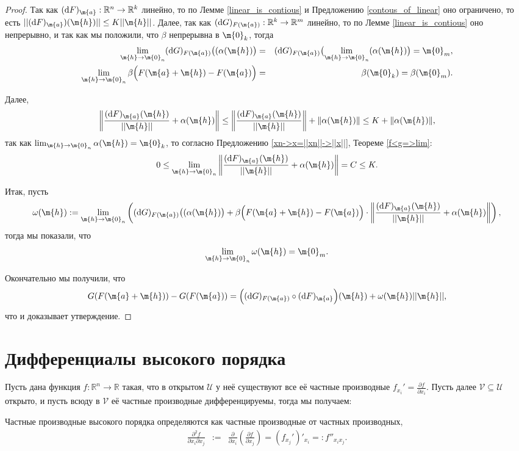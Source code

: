 \begin{proof}
Так как $(\mathrm{d}F)_\m{a}: \mathbb{R}^n \to \mathbb{R}^k$ линейно, то по Лемме \ref{linear_is_contious} и Предложению \ref{contous_of_linear} оно ограничено, то есть $|| (\mathrm{d}F)_\m{a})(\m{h}) || \le K ||\m{h}||$. Далее, так как $(\mathrm{d}G)_{F(\m{a})}: \mathbb{R}^k \to \mathbb{R}^m$ линейно, то по Лемме \ref{linear_is_contious} оно непрерывно, и так как мы положили, что $\beta$ непрерывна в $\m{0}_k$, тогда 
\begin{eqnarray*}
 \lim_{\m{h} \to \m{0}_n}(\mathrm{d}G)_{F(\m{a})}\bigl((\alpha(\m{h})\bigr) &=& (\mathrm{d}G)_{F(\m{a})}\bigl( \lim_{\m{h} \to \m{0}_n} (\alpha(\m{h})\bigr) = \m{0}_m,\\
 \lim_{\m{h} \to \m{0}_n} \beta \Bigl(F(\m{a} + \m{h}) - F(\m{a}) \Bigr) &=& \beta (\m{0}_k) = \beta(\m{0}_m). 
\end{eqnarray*}

Далее, 
\[
  \left\| \frac{(\mathrm{d}F)_\m{a}(\m{h})}{|| \m{h} ||} + \alpha(\m{h})  \right\| \le \left\| \frac{(\mathrm{d}F)_\m{a}(\m{h})}{|| \m{h} ||} \right\| + \| \alpha(\m{h}) \| \le K + \| \alpha(\m{h}) \|,
\]
так как $\lim_{\m{h} \to \m{0}_n}\alpha(\m{h}) = \m{0}_k$, то согласно Предложению \ref{xn->x=||xn||->||x||}, Теореме \ref{f<g=>lim}:
\[
 0 \le \lim_{\m{h} \to \m{0}_n}\left\| \frac{(\mathrm{d}F)_\m{a}(\m{h})}{|| \m{h} ||} + \alpha(\m{h})  \right\| =C \le K.
\]

Итак, пусть
\[
 \omega (\m{h}): = \lim_{\m{h} \to \m{0}_n}\left( (\mathrm{d}G)_{F(\m{a})}\bigl((\alpha(\m{h})\bigr) + \beta \Bigl(F(\m{a} + \m{h}) - F(\m{a}) \Bigr) \cdot \left\| \frac{(\mathrm{d}F)_\m{a}(\m{h})}{|| \m{h} ||} + \alpha(\m{h})  \right\| \right),
\]
тогда мы показали, что
\[
 \lim_{\m{h} \to \m{0}_n} \omega (\m{h}) = \m{0}_m. 
\]

Окончательно мы получили, что
\[
 G(F(\m{a}+\m{h})) -G(F(\m{a})) =\Bigl((\mathrm{d}G)_{F(\m{a})} \circ (\mathrm{d}F)_\m{a}\Bigr) (\m{h}) +   \omega (\m{h}) || \m{h} ||,
\]
что и доказывает утверждение.
\end{proof}


\section{Дифференциалы высокого порядка}

Пусть дана функция $f: \mathbb{R}^n \to \mathbb{R}$ такая, что в открытом $\mathscr{U}$ у неё существуют все её частные производные $f_{x_i}' = \frac{\partial f}{\partial x_i}$. Пусть далее $\mathscr{V} \subseteq \mathscr{U}$ открыто, и пусть всюду в $\mathscr{V}$ её частные производные дифференцируемы, тогда мы получаем:
\begin{definition}
    Частные производные высокого порядка определяются как частные производные от частных производных, \ie
    \begin{eqnarray*}
        \frac{\partial^2 f}{\partial x_i \partial x_j} &:=& \frac{\partial }{\partial x_i}\left( \frac{\partial f}{\partial x_j} \right) = (f_{x_j}')'_{x_i} =: f''_{x_ix_j}. 
    \end{eqnarray*}
\end{definition}

